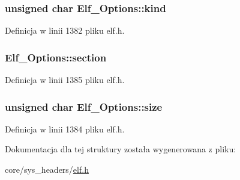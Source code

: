 \hypertarget{struct_elf___options_a3732e1185baf21c513ee7618d334d8c5}{
\subsubsection[{kind}]{\setlength{\rightskip}{0pt plus 5cm}unsigned char Elf\-\_\-\-Options\-::kind}}\label{struct_elf___options_a3732e1185baf21c513ee7618d334d8c5}


Definicja w linii 1382 pliku elf.\-h.

\hypertarget{struct_elf___options_a87449701f0810aa950517897da8ad747}{
\subsubsection[{section}]{ Elf\-\_\-\-Options\-::section}}\label{struct_elf___options_a87449701f0810aa950517897da8ad747}


Definicja w linii 1385 pliku elf.\-h.

\hypertarget{struct_elf___options_a9a66f1e3a53f76858d3520f151864744}{
\subsubsection[{size}]{\setlength{\rightskip}{0pt plus 5cm}unsigned char Elf\-\_\-\-Options\-::size}}\label{struct_elf___options_a9a66f1e3a53f76858d3520f151864744}


Definicja w linii 1384 pliku elf.\-h.



Dokumentacja dla tej struktury została wygenerowana z pliku\-:\begin{DoxyCompactItemize}
\item 
core/sys\-\_\-headers/\hyperlink{elf_8h}{elf.\-h}\end{DoxyCompactItemize}
